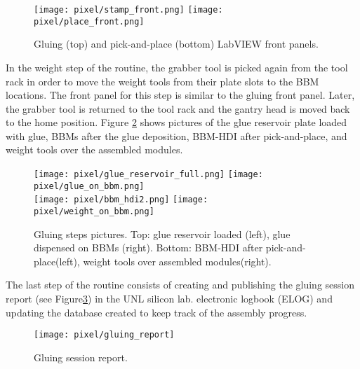 \begin{figure}[h]
\begin{center}
  \texttt{[image: pixel/stamp\_front.png]}
  \texttt{[image: pixel/place\_front.png]}
 \caption[Gluing and pick-and-place LabVIEW front panels]{Gluing (top) and pick-and-place (bottom) LabVIEW front panels.}\label{fig:stamp_place_front}
\end{center}
\end{figure}

In the weight step of the routine, the grabber tool is picked again from the tool rack in order to move the weight tools from their plate slots to the BBM locations. The front panel for this step is similar to the gluing front panel. Later, the grabber tool is returned to the tool rack and the gantry head is moved back to the home position. Figure \ref{fig:gluing_steps} shows pictures of the glue reservoir plate loaded with glue, BBMs after the glue deposition, BBM-HDI after pick-and-place, and weight tools over the assembled modules. 

\begin{figure}[h]
\begin{center}
  \texttt{[image: pixel/glue\_reservoir\_full.png]}
  \texttt{[image: pixel/glue\_on\_bbm.png]}\\
  \texttt{[image: pixel/bbm\_hdi2.png]}
  \texttt{[image: pixel/weight\_on\_bbm.png]}
  \caption[Gluing steps pictures.]{Gluing steps pictures. Top: glue reservoir loaded (left), glue dispensed on BBMs (right). Bottom: BBM-HDI after pick-and-place(left), weight tools over assembled modules(right).}\label{fig:gluing_steps}
\end{center}
\end{figure}

The last step of the routine consists of creating and publishing the gluing session report (see Figure\ref{fig:gluing_report}) in the UNL silicon lab. electronic logbook (ELOG) and updating the database created to keep track of the assembly progress.  

\begin{figure}[h]
\begin{center}
  \texttt{[image: pixel/gluing\_report]}
 \caption[Gluing session report.]{Gluing session report.}\label{fig:gluing_report}
\end{center}
\end{figure}


